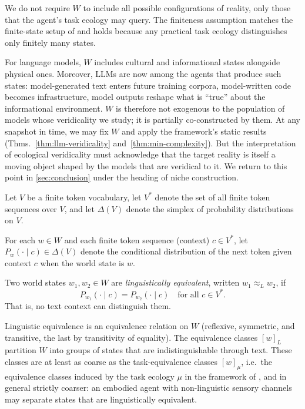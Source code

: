 \documentclass[twoside,11pt]{article}
\begin{document}
We do not require $W$ to include all possible configurations of reality, only those that the agent's task ecology may query. The finiteness assumption matches the finite-state setup of \citet{dallariva_2026} and holds because any practical task ecology distinguishes only finitely many states.

For language models, $W$ includes cultural and informational states alongside physical ones. Moreover, LLMs are now among the agents that produce such states: model-generated text enters future training corpora, model-written code becomes infrastructure, model outputs reshape what is ``true'' about the informational environment. $W$ is therefore not exogenous to the population of models whose veridicality we study; it is partially co-constructed by them. At any snapshot in time, we may fix $W$ and apply the framework's static results (Thms.~\ref{thm:llm-veridicality} and~\ref{thm:min-complexity}). But the interpretation of ecological veridicality must acknowledge that the target reality is itself a moving object shaped by the models that are veridical to it. We return to this point in \cref{sec:conclusion} under the heading of niche construction.

Let $V$ be a finite token vocabulary, let $V^*$ denote the set of all finite token sequences over $V$, and let $\Delta(V)$ denote the simplex of probability distributions on $V$.

\begin{definition}
For each $w \in W$ and each finite token sequence (context) $c \in V^*$, let $P_w(\cdot \mid c) \in \Delta(V)$ denote the conditional distribution of the next token given context $c$ when the world state is $w$.
\end{definition}

\begin{definition}\label{def:ling-equiv}
Two world states $w_1, w_2 \in W$ are \emph{linguistically equivalent}, written $w_1 \approx_L w_2$, if
\[
P_{w_1}(\cdot \mid c) = P_{w_2}(\cdot \mid c)
\quad \text{for all } c \in V^*.
\]
That is, no text context can distinguish them.
\end{definition}

\begin{remark}
Linguistic equivalence is an equivalence relation on $W$ (reflexive, symmetric, and transitive, the last by transitivity of equality). The equivalence classes $[w]_L$ partition $W$ into groups of states that are indistinguishable through text. These classes are at least as coarse as the task-equivalence classes $[w]_\mu$, i.e.\ the equivalence classes induced by the task ecology $\mu$ in the framework of \citet{dallariva_2026}, and in general strictly coarser: an embodied agent with non-linguistic sensory channels may separate states that are linguistically equivalent.
\end{remark}
\end{document}
